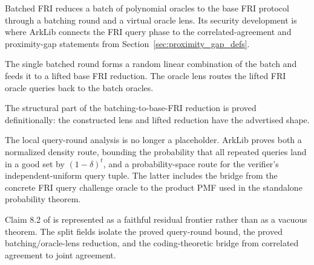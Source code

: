 Batched FRI reduces a batch of polynomial oracles to the base FRI protocol through a batching
round and a virtual oracle lens.  Its security development is where ArkLib connects the FRI
query phase to the correlated-agreement and proximity-gap statements from
Section~\ref{sec:proximity_gap_defs}.

\begin{definition}\label{def:batched_fri_reduction}
    The single batched round forms a random linear combination of the batch and feeds it to a
    lifted base FRI reduction.  The oracle lens routes the lifted FRI oracle queries back to the
    batch oracles.
\end{definition}

\begin{definition}\label{def:batched_fri_lens_package}
    The structural part of the batching-to-base-FRI reduction is proved definitionally: the
    constructed lens and lifted reduction have the advertised shape.
\end{definition}

\begin{lemma}\label{lem:batched_fri_query_round_probability}
    The local query-round analysis is no longer a placeholder.  ArkLib proves both a normalized
    density route, bounding the probability that all repeated queries land in a good set by
    $(1-\delta)^t$, and a probability-space route for the verifier's independent-uniform query
    tuple.  The latter includes the bridge from the concrete FRI query challenge oracle to the
    product PMF used in the standalone probability theorem.
\end{lemma}

\begin{definition}\label{def:batched_fri_claim82_frontier}
    Claim 8.2 of \cite{BCIKS20} is represented as a faithful residual frontier rather than as a
    vacuous theorem.  The split fields isolate the proved query-round bound, the proved
    batching/oracle-lens reduction, and the coding-theoretic bridge from correlated agreement to
    joint agreement.
\end{definition}


